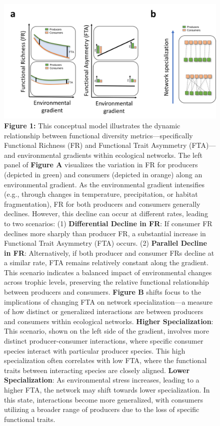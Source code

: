 \documentclass[
]{agujournal2019}
\begin{document}
\begin{figure}[H]

{\centering \includegraphics{Main_figures/00_Figure1.png}

}

\caption{\textbf{Figure 1:} This conceptual model illustrates the
dynamic relationship between functional diversity metrics---specifically
Functional Richness (FR) and Functional Trait Asymmetry (FTA)---and
environmental gradients within ecological networks. The left panel of
\textbf{Figure A} visualizes the variation in FR for producers (depicted
in green) and consumers (depicted in orange) along an environmental
gradient. As the environmental gradient intensifies (e.g., through
changes in temperature, precipitation, or habitat fragmentation), FR for
both producers and consumers generally declines. However, this decline
can occur at different rates, leading to two scenarios: (1)
\textbf{Differential Decline in FR}: If consumer FR declines more
sharply than producer FR, a substantial increase in Functional Trait
Asymmetry (FTA) occurs. (2) \textbf{Parallel Decline in FR}:
Alternatively, if both producer and consumer FRs decline at a similar
rate, FTA remains relatively constant along the gradient. This scenario
indicates a balanced impact of environmental changes across trophic
levels, preserving the relative functional relationship between
producers and consumers. \textbf{Figure B} shifts focus to the
implications of changing FTA on network specialization---a measure of
how distinct or generalized interactions are between producers and
consumers within ecological networks. \textbf{Higher Specialization}:
This scenario, shown on the left side of the gradient, involves more
distinct producer-consumer interactions, where specific consumer species
interact with particular producer species. This high specialization
often correlates with low FTA, where the functional traits between
interacting species are closely aligned. \textbf{Lower Specialization}:
As environmental stress increases, leading to a higher FTA, the network
may shift towards lower specialization. In this state, interactions
become more generalized, with consumers utilizing a broader range of
producers due to the loss of specific functional traits.}

\end{figure}%
\end{document}
